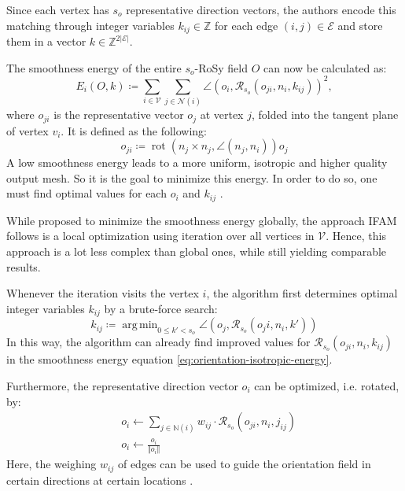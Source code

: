 \documentclass{ACGSeminar}
\DeclareMathOperator{\rot}{rot}
\DeclareMathOperator*{\argmin}{arg\,min}
\begin{document}
Since each vertex has $s_o$ representative direction vectors, the authors encode this matching through integer variables $k_{ij} \in \mathbb{Z}$ for each edge $(i,j) \in \mathcal{E}$ and store them in a vector $k \in \mathbb{Z}^{2 \vert \mathcal{E} \vert}$.

The smoothness energy of the entire $s_o$-RoSy field $O$ can now be calculated as:
\begin{equation}\label{eq:orientation-isotropic-energy}
	E_i(O,k) \coloneqq \sum_{i \in \mathcal{V}} \sum_{j \in \mathcal{N}(i)} \angle(o_i, \mathcal{R}_{s_o}(o_{ji}, n_i, k_{ij}))^2,
\end{equation}
where $o_{ji}$ is the representative vector $o_j$ at vertex $j$, folded into the tangent plane of vertex $v_i$. It is defined as the following:
\begin{equation*}
	o_{ji} \coloneqq \rot(n_j \times n_j, \angle(n_j, n_i))o_j
\end{equation*}
A low smoothness energy leads to a more uniform, isotropic and higher quality output mesh. So it is the goal to minimize this energy. In order to do so, one must find optimal values for each $o_i$ and $k_{ij}$ \cite{jakob2015instant}.\bigskip

While \cite{bommes2009mixed} proposed to minimize the smoothness energy globally, the approach IFAM follows is a local optimization using iteration over all vertices in $\mathcal{V}$. Hence, this approach is a lot less complex than global ones, while still yielding comparable results.

Whenever the iteration visits the vertex $i$, the algorithm first determines optimal integer variables $k_{ij}$ by a brute-force search:
\begin{equation}\label{eq:orientation-intrinsic-integer}
	k_{ij} \coloneqq \argmin_{0 \leq k' < s_o} \angle(o_j, \mathcal{R}_{s_o}(o_ji, n_i, k'))
\end{equation}
In this way, the algorithm can already find improved values for $\mathcal{R}_{s_o}(o_{ji}, n_i, k_{ij})$ in the smoothness energy equation \eqref{eq:orientation-isotropic-energy}.

Furthermore, the representative direction vector $o_i$ can be optimized, i.e. rotated, by:
\begin{equation}\label{eq:orientation-intrinsic-vector}
\begin{split}
	& o_i \leftarrow \sum_{j \in \mathbb{N}(i)} w_{ij} \cdot \mathcal{R}_{s_o}(o_{ji}, n_i, j_{ij})\\
	& o_i \leftarrow \frac{o_i}{\Vert o_i \Vert}
\end{split}
\end{equation}
Here, the weighing $w_{ij}$ of edges can be used to guide the orientation field in certain directions at certain locations \cite{jakob2015instant}.\bigskip
\end{document}
